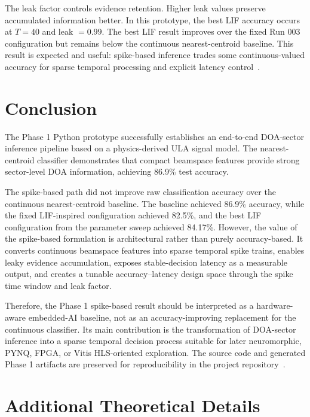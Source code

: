 \documentclass[11pt]{article}
\begin{document}
The leak factor controls evidence retention. Higher leak values preserve accumulated information better. In this prototype, the best LIF accuracy occurs at $T=40$ and leak $=0.99$. The best LIF result improves over the fixed Run 003 configuration but remains below the continuous nearest-centroid baseline. This result is expected and useful: spike-based inference trades some continuous-valued accuracy for sparse temporal processing and explicit latency control~\cite{roy2019towards}.

\section{Conclusion}

The Phase 1 Python prototype successfully establishes an end-to-end DOA-sector inference pipeline based on a physics-derived ULA signal model. The nearest-centroid classifier demonstrates that compact beamspace features provide strong sector-level DOA information, achieving 86.9\% test accuracy.

The spike-based path did not improve raw classification accuracy over the continuous nearest-centroid baseline. The baseline achieved 86.9\% accuracy, while the fixed LIF-inspired configuration achieved 82.5\%, and the best LIF configuration from the parameter sweep achieved 84.17\%. However, the value of the spike-based formulation is architectural rather than purely accuracy-based. It converts continuous beamspace features into sparse temporal spike trains, enables leaky evidence accumulation, exposes stable-decision latency as a measurable output, and creates a tunable accuracy--latency design space through the spike time window and leak factor.

Therefore, the Phase 1 spike-based result should be interpreted as a hardware-aware embedded-AI baseline, not as an accuracy-improving replacement for the continuous classifier. Its main contribution is the transformation of DOA-sector inference into a sparse temporal decision process suitable for later neuromorphic, PYNQ, FPGA, or Vitis HLS-oriented exploration. The source code and generated Phase 1 artifacts are preserved for reproducibility in the project repository~\cite{molhem2026embeddedai}.

\appendix

\section{Additional Theoretical Details}
\end{document}
